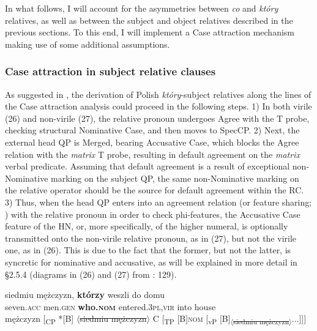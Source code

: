 \documentclass[output=paper]{langsci/langscibook}
\begin{document}
In what follows, I will account for the asymmetries between \textit{co} and \textit{który} relatives, as well as between the subject and object relatives described in the previous sections. To this end, I will implement a Case attraction mechanism making use of some additional assumptions.  

\subsubsection{Case attraction in subject relative clauses}%

As suggested in \citet{Łęska2016}, the derivation of Polish \textit{który}{}-subject relatives along the lines of the Case attraction analysis could proceed in the following steps. 1) In both virile (26) and non-virile (27), the relative pronoun undergoes Agree with the T probe, checking structural Nominative Case, and then moves to SpecCP. 2) Next, the external head QP is Merged, bearing Accusative Case, which blocks the Agree relation with the \textit{matrix} T probe, resulting in default agreement on the \textit{matrix} verbal predicate. Assuming that default agreement is a result of exceptional non-Nominative marking on the subject QP, the same non-Nominative marking on the relative operator should be the source for default agreement within the RC. 3) Thus, when the head QP enters into an agreement relation (or feature sharing; \citealt{Bader2006}) with the relative pronoun in order to check phi-features, the Accusative Case feature of the HN, or, more specifically, of the higher numeral, is optionally transmitted onto the non-virile relative pronoun, as in (27), but not the virile one, as in (26). This is due to the fact that the former, but not the latter, is syncretic for nominative and accusative, as will be explained in more detail in §2.5.4 (diagrams in (26) and (27) from \citealt{Łęska2016}: 129).

\ea%
    \label{ex:leska:26}
    \gll siedmiu   mężczyzn,   \textbf{którzy}   weszli     do   domu\\
         seven.\textsc{acc}   men.\textsc{gen}   \textbf{who.\textsc{nom}}   entered.\textsc{3pl,vir} into   house \\
    \glt {} mężczyzn [\textsubscript{CP} *[B] $\langle$\st{siedmiu mężczyzn}$\rangle$ C [\textsubscript{TP} [B]{\footnotesize\textsc{nom}} [\textsubscript{vP} [B]\textsubscript{$\langle$\st{siedmiu mężczyzn}$\rangle$}...]]]
\z
\end{document}
